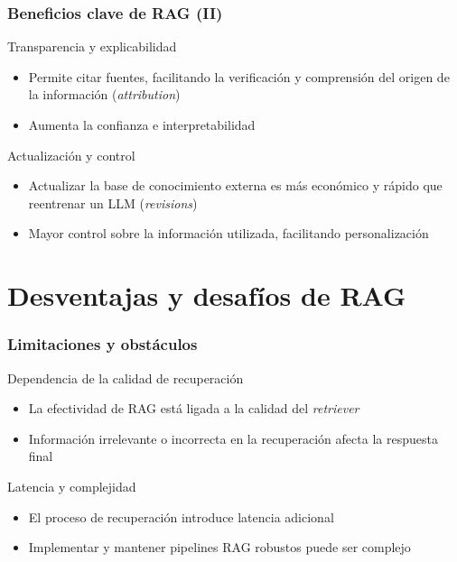 \documentclass[handout]{beamer}
\begin{document}
\begin{frame}
  \frametitle{Beneficios clave de RAG (II)}
  \begin{block}{Transparencia y explicabilidad}
    \begin{itemize}
        \item Permite citar fuentes, facilitando la verificación y comprensión del origen de la información (\textit{attribution})
        \item Aumenta la confianza e interpretabilidad
    \end{itemize}
  \end{block}
  \begin{block}{Actualización y control}
    \begin{itemize}
        \item Actualizar la base de conocimiento externa es más económico y rápido que reentrenar un LLM (\textit{revisions})
        \item Mayor control sobre la información utilizada, facilitando personalización
    \end{itemize}
  \end{block}
\end{frame}

\section{Desventajas y desafíos de RAG}

\begin{frame}
  \frametitle{Limitaciones y obstáculos}
  \begin{alertblock}{Dependencia de la calidad de recuperación}
    \begin{itemize}
        \item La efectividad de RAG está ligada a la calidad del \textit{retriever}
        \item Información irrelevante o incorrecta en la recuperación afecta la respuesta final \parencite{Dai2024RetrievalAugmented}
    \end{itemize}
  \end{alertblock}
  \begin{block}{Latencia y complejidad}
    \begin{itemize}
        \item El proceso de recuperación introduce latencia adicional
        \item Implementar y mantener pipelines RAG robustos puede ser complejo
    \end{itemize}
  \end{block}
\end{frame}
\end{document}
